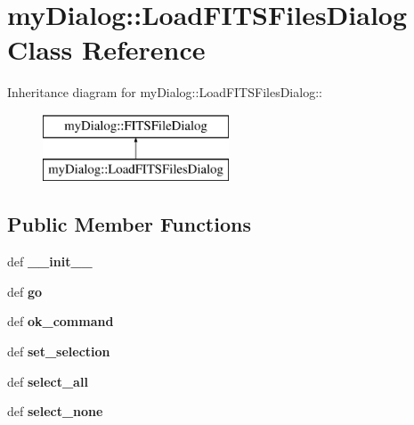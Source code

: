 \section{my\-Dialog::Load\-FITSFiles\-Dialog Class Reference}
\label{classmyDialog_1_1LoadFITSFilesDialog}
Inheritance diagram for my\-Dialog::Load\-FITSFiles\-Dialog::\begin{figure}[H]
\begin{center}
\leavevmode
\includegraphics[height=2cm]{classmyDialog_1_1LoadFITSFilesDialog}
\end{center}
\end{figure}
\subsection*{Public Member Functions}
\begin{CompactItemize}
\item 
def \textbf{\_\-\_\-init\_\-\_\-}\label{classmyDialog_1_1LoadFITSFilesDialog_46a39b56626ca47e7f18aa69c5cc84f7}

\item 
def \textbf{go}\label{classmyDialog_1_1LoadFITSFilesDialog_b769c4f48b7dc382db8ad0704711710c}

\item 
def \textbf{ok\_\-command}\label{classmyDialog_1_1LoadFITSFilesDialog_71ac45a083eb630fa1d276b8c9960e38}

\item 
def \textbf{set\_\-selection}\label{classmyDialog_1_1LoadFITSFilesDialog_4fdd7d3e8252e9fe3e8af9a7c56331e3}

\item 
def \textbf{select\_\-all}\label{classmyDialog_1_1LoadFITSFilesDialog_0bdcbf5b9d5c4466f82e35fcfaecac84}

\item 
def \textbf{select\_\-none}\label{classmyDialog_1_1LoadFITSFilesDialog_2512bf63effcac02966d76d144f9a8f6}

\end{CompactItemize}
